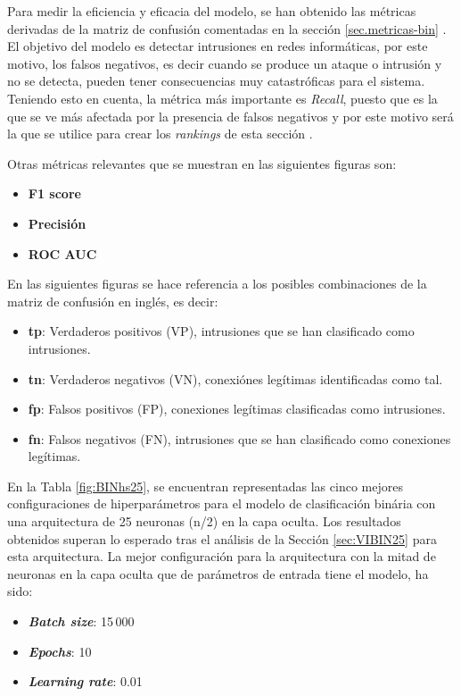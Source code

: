 Para medir la eficiencia y eficacia del modelo, se han obtenido las métricas derivadas de la matriz de confusión comentadas en la sección \ref{sec.metricas-bin} . El objetivo del modelo es detectar intrusiones en redes informáticas, por este motivo, los falsos negativos, es decir cuando se produce un ataque o intrusión y no se detecta, pueden tener consecuencias muy catastróficas para el sistema. Teniendo esto en cuenta, la métrica más importante es \textit{Recall}, puesto que es la que se ve más afectada por la presencia de falsos negativos y por este motivo será la que se utilice para crear los \textit{rankings} de esta sección .

Otras métricas relevantes que se muestran en las siguientes figuras son:
\begin{itemize}
	\item \textbf{F1 score}%
	\item \textbf{Precisión}%
	\item \textbf{ROC AUC}%
\end{itemize}

En las siguientes figuras se hace referencia a los posibles combinaciones de la matriz de confusión en inglés, es decir:
\begin{itemize}
	\item \textbf{tp}: Verdaderos positivos (VP), intrusiones que se han clasificado como intrusiones.
	\item \textbf{tn}: Verdaderos negativos (VN), conexiónes legítimas identificadas como tal.
	\item \textbf{fp}: Falsos positivos (FP), conexiones legítimas clasificadas como intrusiones.
	\item \textbf{fn}: Falsos negativos (FN), intrusiones que se han clasificado como conexiones legítimas.
\end{itemize}

En la Tabla \ref{fig:BINhs25}, se encuentran representadas las cinco mejores configuraciones de hiperparámetros para el modelo de clasificación binária con una arquitectura de 25 neuronas (n/2) en la capa oculta. Los resultados obtenidos superan lo esperado tras el análisis de la Sección \ref{sec:VIBIN25} para esta arquitectura. La mejor configuración para la arquitectura con la mitad de neuronas en la capa oculta que de parámetros de entrada tiene el modelo, ha sido:
\begin{itemize}
	\item \textbf{\textit{Batch size}}: 15\,000
	\item \textbf{\textit{Epochs}}: 10
	\item \textbf{\textit{Learning rate}}: 0.01
\end{itemize}


